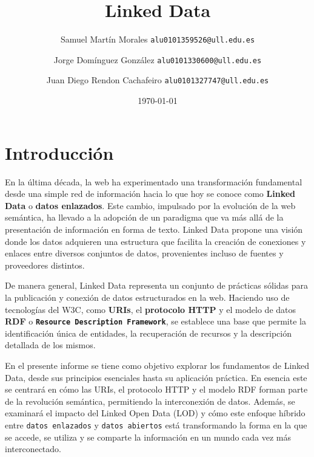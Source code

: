\documentclass[11pt]{report}
\begin{document}
	
	
	\title{Linked Data}
	\author{Samuel Martín Morales  \texttt{alu0101359526@ull.edu.es} \and Jorge Domínguez González  \texttt{alu0101330600@ull.edu.es} \and Juan Diego Rendon Cachafeiro \texttt{alu0101327747@ull.edu.es}}
	\date{\today}
	
	\maketitle
	
	\tableofcontents
	
	\chapter{Introducción}

  En la última década, la web ha experimentado una transformación fundamental desde una simple red de información hacia lo que hoy se conoce como \textbf{Linked Data} o \textbf{datos enlazados}. Este cambio, impulsado por la evolución de la web semántica, ha llevado a la adopción de un paradigma que va más allá de la  presentación de información en forma de texto. Linked Data propone una visión donde los datos adquieren una estructura que facilita la creación de conexiones y enlaces entre diversos conjuntos de datos, provenientes incluso de fuentes y proveedores distintos.

De manera general, Linked Data representa un conjunto de prácticas sólidas para la publicación y conexión de datos estructurados en la web. Haciendo uso de tecnologías del W3C, como \textbf{URIs}, el \textbf{protocolo HTTP} y el modelo de datos \textbf{RDF} o \texttt{\textbf{Resource Description Framework}}, se establece una base que permite la identificación única de entidades, la recuperación de recursos y la descripción detallada de los mismos.

En el presente informe se tiene como objetivo explorar los fundamentos de Linked Data, desde sus principios esenciales hasta su aplicación práctica. En esencia este se centrará en cómo las URIs, el protocolo HTTP y el modelo RDF forman parte de la revolución semántica, permitiendo la interconexión de datos. Además, se examinará el impacto del Linked Open Data (LOD) y cómo este enfoque híbrido entre \texttt{datos enlazados} y \texttt{datos abiertos} está transformando la forma en la que se accede, se utiliza y se comparte la información en un mundo cada vez más interconectado.
	 
\end{document}
